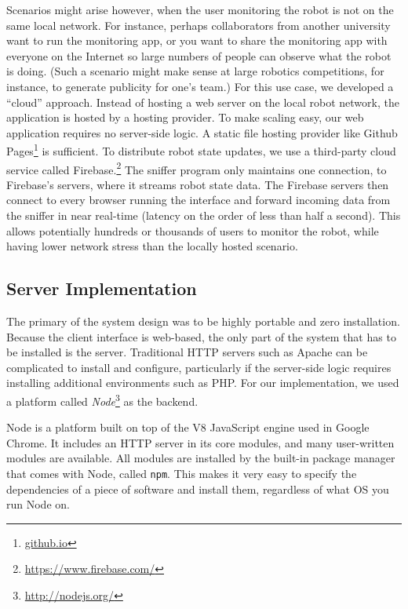 \documentclass[letterpaper, 10 pt, conference]{ieee/ieeeconf}  %
\begin{document}
Scenarios might arise however, when the user monitoring the robot is not on the same local network.
For instance, perhaps collaborators from another university want to run the monitoring app, or you want to share the monitoring app with everyone on the Internet so large numbers of people can observe what the robot is doing.
(Such a scenario might make sense at large robotics competitions, for instance, to generate publicity for one's team.)
For this use case, we developed a ``cloud'' approach.
Instead of hosting a web server on the local robot network, the application is hosted by a hosting provider.
To make scaling easy, our web application requires no server-side logic.
A static file hosting provider like Github Pages\footnote{\url{github.io}} is sufficient.
To distribute robot state updates, we use a third-party cloud service called Firebase.\footnote{\url{https://www.firebase.com/}}
The sniffer program only maintains one connection, to Firebase's servers, where it streams robot state data.
The Firebase servers then connect to every browser running the interface and forward incoming data from the sniffer in near real-time (latency on the order of less than half a second).
This allows potentially hundreds or thousands of users to monitor the robot, while having lower network stress than the locally hosted scenario.

\subsection{Server Implementation}
The primary of the system design was to be highly portable and zero installation.
Because the client interface is web-based, the only part of the system that has to be installed is the server.
Traditional HTTP servers such as Apache can be complicated to install and configure, particularly if the server-side logic requires installing additional environments such as PHP.
For our implementation, we used a platform called \textit{Node}\footnote{\url{http://nodejs.org/}} as the backend.

Node is a platform built on top of the V8 JavaScript engine used in Google Chrome.
It includes an HTTP server in its core modules, and many user-written modules are available.
All modules are installed by the built-in package manager that comes with Node, called \texttt{npm}.
This makes it very easy to specify the dependencies of a piece of software and install them, regardless of what OS you run Node on.
\end{document}
